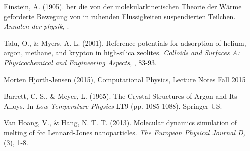 \documentclass[twoside,utf8]{article}
\begin{document}
\begin{multicols}{2}
\begin{thebibliography}{99} %

 Einstein, A. (1905). 
 ber die von der molekularkinetischen Theorie der W{\"a}rme geforderte Bewegung von in ruhenden Fl{\"u}ssigkeiten suspendierten Teilchen. 
 \newblock \textit{Annalen der physik,}
 .
 
 Talu, O., \& Myers, A. L. (2001). 
 \newblock Reference potentials for adsorption of helium, argon, methane, and krypton in high-silica zeolites. 
 \newblock \textit{ Colloids and Surfaces A: Physicochemical and Engineering Aspects}, 
 , 83-93.

 Morten Hjorth-Jensen (2015),
 \newblock Computational Physics, Lecture Notes Fall 2015

 Barrett, C. S., \& Meyer, L. (1965).
 \newblock The Crystal Structures of Argon and Its Alloys. 
 \newblock In \textit{ Low Temperature Physics}
 \newblock LT9 (pp. 1085-1088). Springer US.

  Van Hoang, V., \& Hang, N. T. T. (2013).
  \newblock Molecular dynamics simulation of melting of fcc Lennard-Jones nanoparticles.
  \newblock \textit{ The European Physical Journal D, }
  (3), 1-8.


\end{thebibliography}

\end{multicols}
\end{document}
